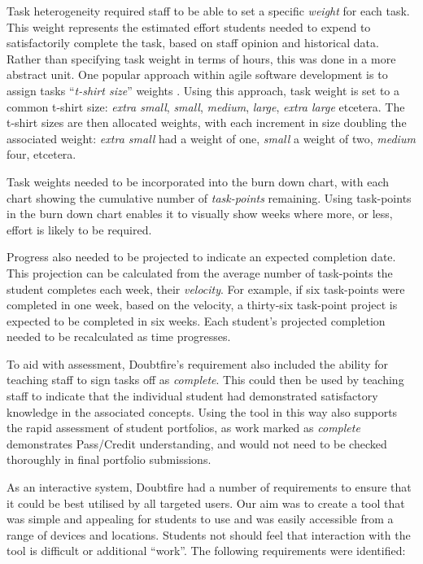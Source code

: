 Task heterogeneity required staff to be able to set a specific \emph{weight} for each task. This weight represents the estimated effort students needed to expend to satisfactorily complete the task, based on staff opinion and historical data. Rather than specifying task weight in terms of hours, this was done in a more abstract unit. One popular approach within agile software development is to assign tasks ``\emph{t-shirt size}'' weights \cite{Peixoto:2010}. Using this approach, task weight is set to a common t-shirt size: \emph{extra small}, \emph{small}, \emph{medium}, \emph{large}, \emph{extra large} etcetera. The t-shirt sizes are then allocated weights, with each increment in size doubling the associated weight: \emph{extra small} had a weight of one, \emph{small} a weight of two, \emph{medium} four, etcetera.

Task weights needed to be incorporated into the burn down chart, with each chart showing the cumulative number of \emph{task-points} remaining. Using task-points in the burn down chart enables it to visually show weeks where more, or less, effort is likely to be required.

Progress also needed to be projected to indicate an expected completion date. This projection can be calculated from the average number of task-points the student completes each week, their \emph{velocity}.  For example, if six task-points were completed in one week, based on the velocity, a thirty-six task-point project is expected to be completed in six weeks. Each student's projected completion needed to be recalculated as time progresses. 

To aid with assessment, Doubtfire's requirement also included the ability for teaching staff to sign tasks off as \emph{complete}. This could then be used by teaching staff to indicate that the individual student had demonstrated satisfactory knowledge in the associated concepts. Using the tool in this way also supports the rapid assessment of student portfolios, as work marked as \emph{complete} demonstrates Pass/Credit understanding, and would not need to be checked thoroughly in final portfolio submissions. 

As an interactive system, Doubtfire had a number of requirements to ensure that it could be best utilised by all targeted users. Our aim was to create a tool that was simple and appealing for students to use and was easily accessible from a range of devices and locations. Students not should feel that interaction with the tool is difficult or additional ``work''. The following requirements were identified:

